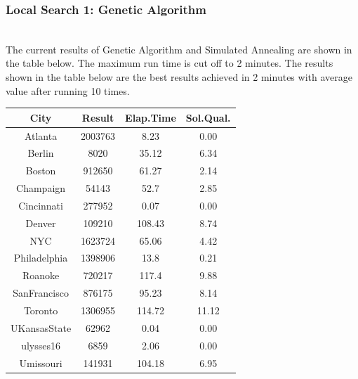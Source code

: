 \subsubsection{Local Search 1: Genetic Algorithm}
\hfill\\
The current results of Genetic Algorithm and Simulated Annealing are shown in the table below. The maximum run time is cut off to 2 minutes. The results shown in the table below are the best results achieved in 2 minutes with average value after running 10 times.\\
\begin{center}
\begin{tabular}{ |c|c|c|c| } 
 \hline
 City        & Result  & Elap.Time & Sol.Qual. \\
 \hline
Atlanta      & 2003763 & 8.23      & 0.00      \\
Berlin       & 8020    & 35.12     & 6.34      \\
Boston       & 912650  & 61.27     & 2.14      \\
Champaign    & 54143   & 52.7      & 2.85      \\
Cincinnati   & 277952  & 0.07      & 0.00      \\
Denver       & 109210  & 108.43    & 8.74      \\
NYC          & 1623724 & 65.06     & 4.42      \\
Philadelphia & 1398906 & 13.8      & 0.21      \\
Roanoke      & 720217  & 117.4     & 9.88     \\
SanFrancisco & 876175  & 95.23     & 8.14      \\
Toronto      & 1306955 & 114.72    & 11.12     \\
UKansasState & 62962   & 0.04      & 0.00      \\
ulysses16    & 6859    & 2.06      & 0.00      \\
Umissouri    & 141931  & 104.18    & 6.95     \\
\hline
\end{tabular}
\end{center}

